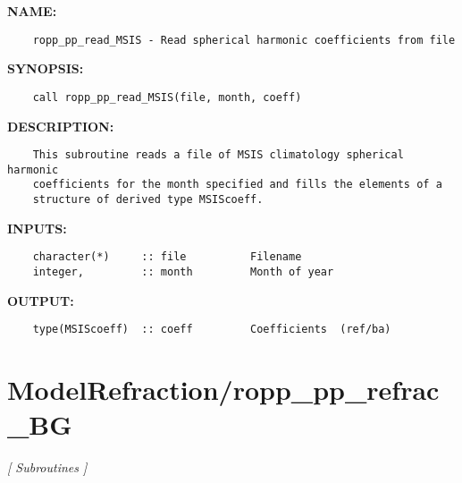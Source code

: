 \label{ch:robo38}
\label{ch:ModelRefraction_ropp_pp_read_MSIS}
\textbf{NAME:}\hspace{0.08in}\begin{Verbatim}
    ropp_pp_read_MSIS - Read spherical harmonic coefficients from file
\end{Verbatim}
\textbf{SYNOPSIS:}\hspace{0.08in}\begin{Verbatim}
    call ropp_pp_read_MSIS(file, month, coeff)
\end{Verbatim}
\textbf{DESCRIPTION:}\hspace{0.08in}\begin{Verbatim}
    This subroutine reads a file of MSIS climatology spherical harmonic
    coefficients for the month specified and fills the elements of a 
    structure of derived type MSIScoeff.
\end{Verbatim}
\textbf{INPUTS:}\hspace{0.08in}\begin{Verbatim}
    character(*)     :: file          Filename
    integer,         :: month         Month of year
\end{Verbatim}
\textbf{OUTPUT:}\hspace{0.08in}\begin{Verbatim}
    type(MSIScoeff)  :: coeff         Coefficients  (ref/ba)
\end{Verbatim}
\section{ModelRefraction/ropp\_pp\_refrac\_BG}
\textsl{[ Subroutines ]}

